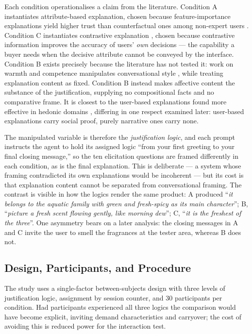 \documentclass[conference]{IEEEtran}
\begin{document}
Each condition operationalises a claim from the literature. Condition A instantiates
attribute-based explanation, chosen because feature-importance explanations yield higher
trust than counterfactual ones among non-expert users \cite{brito2023}. Condition C
instantiates contrastive explanation \cite{stepin2021}, chosen because contrastive
information improves the accuracy of users' \textit{own} decisions \cite{celar2023} --- the
capability a buyer needs when the decisive attribute cannot be conveyed by the interface.
Condition B exists precisely because the literature has not tested it: work on warmth and
competence manipulates conversational style \cite{libaoku2024}, \cite{cheng2022} while
treating explanation content as fixed. Condition B instead makes affective content the
substance of the justification, supplying no compositional facts and no comparative frame.
It is closest to the user-based explanations found more effective in hedonic domains
\cite{chen2024}, differing in one respect examined later: user-based explanations carry
social proof, purely narrative ones carry none.

The manipulated variable is therefore the \textit{justification logic}, and each prompt
instructs the agent to hold its assigned logic ``from your first greeting to your final
closing message,'' so the ten elicitation questions are framed differently in each
condition, as is the final explanation. This is deliberate --- a system whose framing
contradicted its own explanations would be incoherent --- but its cost is that explanation
content cannot be separated from conversational framing. The contrast is visible in how the
logics render the same product: A produced ``\textit{it belongs to the aquatic family with
green and fresh-spicy as its main character}''; B, ``\textit{picture a fresh scent flowing
gently, like morning dew}''; C, ``\textit{it is the freshest of the three}''. One asymmetry
bears on a later analysis: the closing messages in A and C invite the user to smell the
fragrances at the tester area, whereas B does not.

\subsection{Design, Participants, and Procedure}

The study uses a single-factor between-subjects design with three levels of justification
logic, assignment by session counter, and 30 participants per condition. Had participants
experienced all three logics the comparison would have become explicit, inviting demand
characteristics and carryover; the cost of avoiding this is reduced power for the
interaction test.
\end{document}
